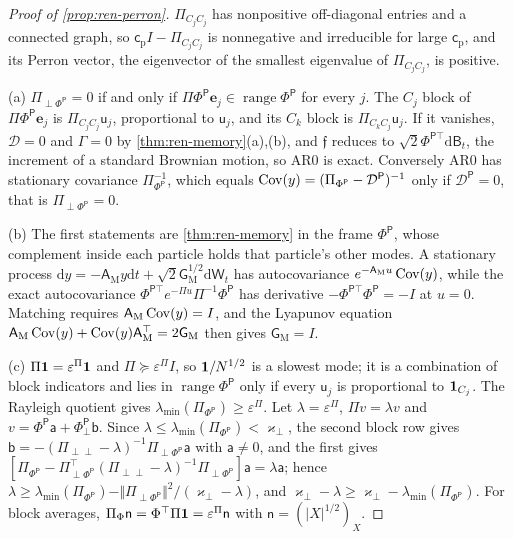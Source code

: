 \begin{proof}[Proof of \cref{prop:ren-perron}]
$\Pi_{C_jC_j}$ has nonpositive off-diagonal entries and a connected graph, so $\mathsf c_{\mathrm p}I-\Pi_{C_jC_j}$ is nonnegative and irreducible for large $\mathsf c_{\mathrm p}$, and its Perron vector, the eigenvector of the smallest eigenvalue of $\Pi_{C_jC_j}$, is positive.

(a) $\Pi_{\perp\Phi^{\mathsf P}}=0$ if and only if $\Pi\Phi^{\mathsf P}\mathbf e_j\in\operatorname{range}\Phi^{\mathsf P}$ for every $j$. The $C_j$ block of $\Pi\Phi^{\mathsf P}\mathbf e_j$ is $\Pi_{C_jC_j}\mathsf u_j$, proportional to $\mathsf u_j$, and its $C_k$ block is $\Pi_{C_kC_j}\mathsf u_j$. If it vanishes, $\mathcal D=0$ and $\Gamma=0$ by \cref{thm:ren-memory}(a),(b), and $\mathfrak f$ reduces to $\sqrt2\Phi^{\mathsf P\top}\mathrm d\mathsf B_t$, the increment of a standard Brownian motion, so AR0 is exact. Conversely AR0 has stationary covariance $\Pi_{\Phi^{\mathsf P}}^{-1}$, which equals $\operatorname{Cov}(y)=(\Pi_{\Phi^{\mathsf P}}-\mathcal D^{\mathsf P})^{-1}$ only if $\mathcal D^{\mathsf P}=0$, that is $\Pi_{\perp\Phi^{\mathsf P}}=0$.

(b) The first statements are \cref{thm:ren-memory} in the frame $\Phi^{\mathsf P}$, whose complement inside each particle holds that particle's other modes. A stationary process $\mathrm dy=-\mathsf A_{\mathrm M}y\mathrm dt+\sqrt2\mathsf G_{\mathrm M}^{1/2}\mathrm d\mathsf W_t$ has autocovariance $e^{-\mathsf A_{\mathrm M}u}\operatorname{Cov}(y)$, while the exact autocovariance $\Phi^{\mathsf P\top}e^{-\Pi u}\Pi^{-1}\Phi^{\mathsf P}$ has derivative $-\Phi^{\mathsf P\top}\Phi^{\mathsf P}=-I$ at $u=0$. Matching requires $\mathsf A_{\mathrm M}\operatorname{Cov}(y)=I$, and the Lyapunov equation $\mathsf A_{\mathrm M}\operatorname{Cov}(y)+\operatorname{Cov}(y)\mathsf A_{\mathrm M}^\top=2\mathsf G_{\mathrm M}$ then gives $\mathsf G_{\mathrm M}=I$.

(c) $\Pi\mathbf{1}=\varepsilon^\Pi\mathbf{1}$ and $\Pi\succeq\varepsilon^\Pi I$, so $\mathbf{1}/N^{1/2}$ is a slowest mode; it is a combination of block indicators and lies in $\operatorname{range}\Phi^{\mathsf P}$ only if every $\mathsf u_j$ is proportional to $\mathbf{1}_{C_j}$. The Rayleigh quotient gives $\lambda_{\min}(\Pi_{\Phi^{\mathsf P}})\ge\varepsilon^\Pi$. Let $\lambda=\varepsilon^\Pi$, $\Pi v=\lambda v$ and $v=\Phi^{\mathsf P}\mathsf a+\Phi^{\mathsf P}_\perp\mathsf b$. Since $\lambda\le\lambda_{\min}(\Pi_{\Phi^{\mathsf P}})<\varkappa_\perp$, the second block row gives $\mathsf b=-(\Pi_{\perp\perp}-\lambda)^{-1}\Pi_{\perp\Phi^{\mathsf P}}\mathsf a$ with $\mathsf a\neq0$, and the first gives $[\Pi_{\Phi^{\mathsf P}}-\Pi_{\perp\Phi^{\mathsf P}}^\top(\Pi_{\perp\perp}-\lambda)^{-1}\Pi_{\perp\Phi^{\mathsf P}}]\mathsf a=\lambda\mathsf a$; hence $\lambda\ge\lambda_{\min}(\Pi_{\Phi^{\mathsf P}})-\Vert\Pi_{\perp\Phi^{\mathsf P}}\Vert^2/(\varkappa_\perp-\lambda)$, and $\varkappa_\perp-\lambda\ge\varkappa_\perp-\lambda_{\min}(\Pi_{\Phi^{\mathsf P}})$. For block averages, $\Pi_\Phi\mathsf n=\Phi^\top\Pi\mathbf{1}=\varepsilon^\Pi\mathsf n$ with $\mathsf n=(\lvert X\rvert^{1/2})_X$.


\end{proof}

